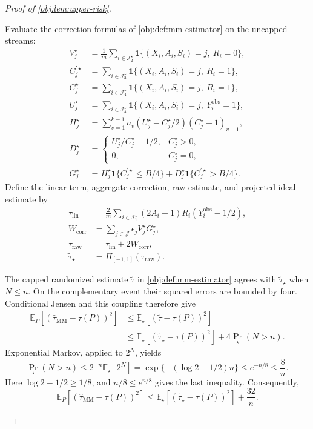 \documentclass[11pt]{article}
\begin{document}
\begin{proof}[Proof of \cref{obj:lem:upper-risk}]
\begin{enumerate}
Evaluate the correction formulas of \cref{obj:def:mm-estimator} on the uncapped streams:
\[
\begin{aligned}
V_j^\star&=\frac1m\sum_{i\in\mathcal I_2^\star}
\mathbf1\{(X_i,A_i,S_i)=j,\ R_i=0\},\\
C_j^{\prime\star}&=\sum_{i\in\mathcal I_3^\star}
\mathbf1\{(X_i,A_i,S_i)=j,\ R_i=1\},\\
C_j^\star&=\sum_{i\in\mathcal I_4^\star}
\mathbf1\{(X_i,A_i,S_i)=j,\ R_i=1\},\\
U_j^\star&=\sum_{i\in\mathcal I_4^\star}
\mathbf1\{(X_i,A_i,S_i)=j,\ Y_i^{\mathrm{obs}}=1\},\\
H_j^\star&=\sum_{v=1}^{k-1}
a_v(U_j^\star-C_j^\star/2)(C_j^\star-1)_{v-1},\\
D_j^\star&=
\begin{cases}
U_j^\star/C_j^\star-1/2,&C_j^\star>0,\\
0,&C_j^\star=0,
\end{cases}\\
G_j^\star&=
H_j^\star\mathbf1\{C_j^{\prime\star}\le B/4\}
+D_j^\star\mathbf1\{C_j^{\prime\star}>B/4\}.
\end{aligned}
\]
Define the linear term, aggregate correction, raw estimate, and projected ideal estimate by
\[
\begin{aligned}
\tau_{\mathrm{lin}}
&=\frac2m\sum_{i\in\mathcal I_1^\star}
(2A_i-1)R_i(Y_i^{\mathrm{obs}}-1/2),\\
W_{\mathrm{corr}}
&=\sum_{j\in\mathcal J}\epsilon_jV_j^\star G_j^\star,\\
\tau_{\mathrm{raw}}
&=\tau_{\mathrm{lin}}+2W_{\mathrm{corr}},\\
\widetilde\tau_\star&=\Pi_{[-1,1]}(\tau_{\mathrm{raw}}).
\end{aligned}
\]

The capped randomized estimate \(\widetilde\tau\) in
\cref{obj:def:mm-estimator} agrees with \(\widetilde\tau_\star\) when \(N\le n\).
On the complementary event their squared errors are bounded by four.
Conditional Jensen and this coupling therefore give
\[
\begin{aligned}
\mathbb E_P[(\widehat\tau_{\mathrm{MM}}-\tau(P))^2]
&\le\mathbb E_\star[(\widetilde\tau-\tau(P))^2]\\
&\le\mathbb E_\star[(\widetilde\tau_\star-\tau(P))^2]
+4\Pr_\star(N>n).
\end{aligned}
\]
Exponential Markov, applied to \(2^N\), yields
\[
\Pr_\star(N>n)
\le2^{-n}\mathbb E_\star[2^N]
=\exp\{-(\log2-1/2)n\}
\le e^{-n/8}
\le\frac8n.
\]
Here \(\log2-1/2\ge1/8\), and \(n/8\le e^{n/8}\) gives the last inequality. Consequently,
\[
\mathbb E_P[(\widehat\tau_{\mathrm{MM}}-\tau(P))^2]
\le\mathbb E_\star[(\widetilde\tau_\star-\tau(P))^2]
+\frac{32}{n}.
\]


\end{enumerate}
\end{proof}
\end{document}
